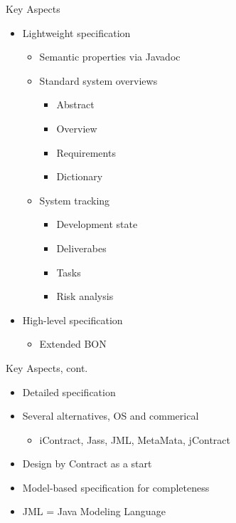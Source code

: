 \documentclass[%
final,
slideColor,
nototal,
nocolorBG,
pdf,
accumulate,
next,
]{prosper}
\begin{document}
\begin{slide}{Key Aspects}
  \begin{itemize}
  \item Lightweight specification
    \begin{itemize}
    \item Semantic properties via Javadoc
    \item Standard system overviews
      \begin{itemize}
      \item Abstract
      \item Overview
      \item Requirements
      \item Dictionary
      \end{itemize}
    \item System tracking
      \begin{itemize}
      \item Development state
      \item Deliverabes
      \item Tasks
      \item Risk analysis
      \end{itemize}
    \end{itemize}
  \item High-level specification
    \begin{itemize}
    \item Extended BON
    \end{itemize}
  \end{itemize}
\end{slide}

\begin{slide}{Key Aspects, cont.}
  \begin{itemize}
  \item Detailed specification
  \item Several alternatives, OS and commerical
    \begin{itemize}
    \item iContract, Jass, JML, MetaMata, jContract
    \end{itemize}
  \item Design by Contract as a start
  \item Model-based specification for completeness
  \item JML = Java Modeling Language
  \end{itemize}
\end{slide}
\end{document}
